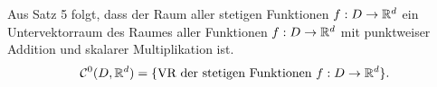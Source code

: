 \documentclass[../ana1.tex]{subfiles}
\begin{document}
\begin{bem}
    Aus Satz 5 folgt, dass der Raum aller stetigen Funktionen 
    \( f: D\rightarrow \mathbb{R}^d \) ein Untervektorraum des Raumes
    aller Funktionen \( f: D \rightarrow \mathbb{R}^d \) mit punktweiser 
    Addition und skalarer Multiplikation ist.
    \[ \mathcal{C}^0 (D, \mathbb{R}^d) = \{ \text{VR der stetigen Funktionen } 
    f: D \rightarrow \mathbb{R}^d \}. \]
\end{bem}
\end{document}
